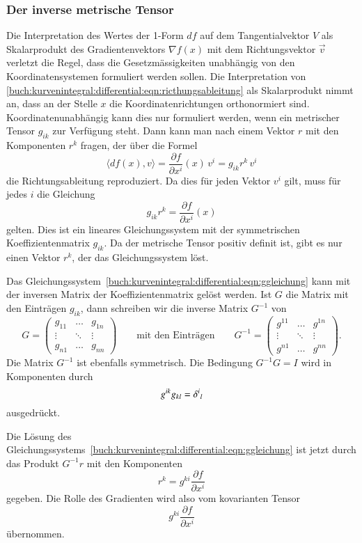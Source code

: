 \subsubsection{Der inverse metrische Tensor}
Die Interpretation des Wertes der 1-Form $df$ auf dem Tangentialvektor $V$ 
als Skalarprodukt des Gradientenvektors $\nabla f(x)$ mit dem
Richtungsvektor $\vec{v}$ verletzt die Regel, dass die Gesetzmässigkeiten
unabhängig von den Koordinatensystemen formuliert werden sollen.
Die Interpretation von
\eqref{buch:kurvenintegral:differential:eqn:ricthungsableitung}
als Skalarprodukt nimmt an, dass an der Stelle $x$ die Koordinatenrichtungen
orthonormiert sind.
Koordinatenunabhängig kann dies nur formuliert werden, wenn ein metrischer
Tensor $g_{ik}$ zur Verfügung steht.
Dann kann man nach einem Vektor $r$ mit den Komponenten $r^k$ fragen,
der über die Formel
\[
\langle df(x),v\rangle
=
\frac{\partial f}{\partial x^i}(x)\,v^i
=
g_{ik} r^k\,v^i
\]
die Richtungsableitung reproduziert.
Da dies für jeden Vektor $v^i$ gilt, muss für jedes $i$ die Gleichung
\begin{equation}
g_{ik}r^k = \frac{\partial f}{\partial x^i}(x)
\label{buch:kurvenintegral:differential:eqn:ggleichung}
\end{equation}
gelten.
Dies ist ein lineares Gleichungssystem mit der symmetrischen
Koeffizientenmatrix $g_{ik}$.
Da der metrische Tensor positiv definit ist, gibt es nur einen
Vektor $r^k$, der das Gleichungssystem löst.

Das Gleichungssystem~\eqref{buch:kurvenintegral:differential:eqn:ggleichung}
kann mit der inversen Matrix der Koeffizientenmatrix gelöst
werden.
Ist $G$ die Matrix mit den Einträgen $g_{ik}$, dann schreiben wir
die inverse Matrix $G^{-1}$ von
%
\[
G
=
\begin{pmatrix}
g_{11}&\dots &g_{1n}\\
\vdots&\ddots&\vdots\\
g_{n1}&\dots &g_{nn}
\end{pmatrix}
\qquad
\text{mit den Einträgen}
\qquad
G^{-1}
= 
\begin{pmatrix}
g^{11}&\dots &g^{1n}\\
\vdots&\ddots&\vdots\\
g^{n1}&\dots &g^{nn}
\end{pmatrix}.
\]
Die Matrix $G^{-1}$ ist ebenfalls symmetrisch.
Die Bedingung $G^{-1}G=I$ wird in Komponenten durch
\[
g^{ik}g_{kl}
=
\delta^i\mathstrut_l
\]
ausgedrückt.

Die Lösung des
Gleichungssystems~\eqref{buch:kurvenintegral:differential:eqn:ggleichung}
ist jetzt durch das Produkt $G^{-1}r$ mit den Komponenten
\[
r^k = g^{ki}\frac{\partial f}{\partial x^i}
\]
gegeben.
Die Rolle des Gradienten wird also vom kovarianten Tensor
\[
g^{ki}\frac{\partial f}{\partial x^i}
\]
übernommen.

